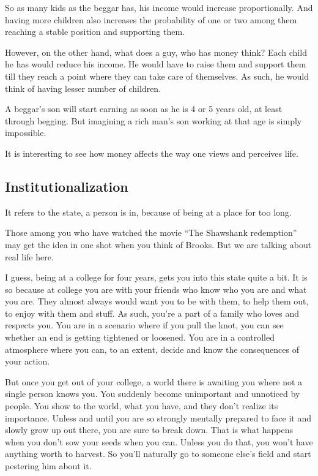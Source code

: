\documentclass[twoside,11pt,titlepage]{article}
\begin{document}
So as many kids as the beggar has, his income would increase proportionally. And having more children also increases the probability of one or two among them reaching a stable position and supporting them.

However, on the other hand, what does a guy, who has money think? Each child he has would reduce his income. He would have to raise them and support them till they reach a point where they can take care of themselves. As such, he would think of having lesser number of children.

A beggar's son will start earning as soon as he is 4 or 5 years old, at least through begging. But imagining a rich man's son working at that age is simply impossible.

It is interesting to see how money affects the way one views and perceives life.

\newpage
\begin{center}
  \section{Institutionalization}
\end{center}
\bigskip
\bigskip
\bigskip

It refers to the state, a person is in, because of being at a place for too long.

Those among you who have watched the movie ``The Shawshank redemption'' may get the idea in one shot when you think of Brooks. But we are talking about real life here.

I guess, being at a college for four years, gets you into this state quite a bit. It is so because at college you are with your friends who know who you are and what you are. They almost always would want you to be with them, to help them out, to enjoy with them and stuff. As such, you're a part of a family who loves and respects you. You are in a scenario where if you pull the knot, you can see whether an end is getting tightened or loosened. You are in a controlled atmosphere where you can, to an extent, decide and know the consequences of your action.

But once you get out of your college, a world there is awaiting you where not a single person knows you. You suddenly become unimportant and unnoticed by people. You show to the world, what you have, and they don't realize its importance. Unless and until you are so strongly mentally prepared to face it and slowly grow up out there, you are sure to break down. That is what happens when you don't sow your seeds when you can. Unless you do that, you won't have anything worth to harvest. So you'll naturally go to someone else's field and start pestering him about it.
\end{document}
